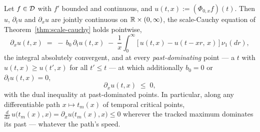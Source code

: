 \begin{corollary}\label{cor:past-dominating}
Let $f \in \mathcal{D}$ with $f'$ bounded and continuous, and $u(t, x) := (\Phi_{0,x}f)(t)$. Then
$u$, $\partial_t u$ and $\partial_x u$ are jointly continuous on $\mathbb{R} \times (0,\infty)$,
the scale-Cauchy equation of Theorem~\ref{thm:scale-cauchy} holds pointwise,
\[
  \partial_x u(t, x)
  \;=\; -\,b_0\,\partial_t u(t, x)
  \;-\; \frac{1}{x}\int_0^\infty \bigl[\,u(t, x) - u(t - xr,\, x)\,\bigr]\,\nu_1(dr),
\]
the integral absolutely convergent, and at every \emph{past-dominating} point --- a $t$ with
$u(t, x) \ge u(t', x)$ for all $t' \le t$ --- at which additionally $b_0 = 0$ or
$\partial_t u(t, x) = 0$,
\[
  \partial_x u(t, x) \;\le\; 0 ,
\]
with the dual inequality at past-dominated points. In particular, along any differentiable
path $x \mapsto t_m(x)$ of temporal critical points,
$\tfrac{d}{dx}\,u\bigl(t_m(x), x\bigr) = \partial_x u\bigl(t_m(x), x\bigr) \le 0$ wherever
the tracked maximum dominates its past --- whatever the path's speed.
\end{corollary}


